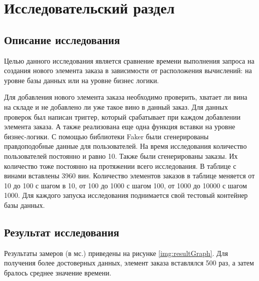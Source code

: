 \chapter{Исследовательский раздел}

\section{Описание исследования}

Целью данного исследования является сравнение времени выполнения запроса на создания нового элемента заказа в зависимости от расположения вычислений: на уровне базы данных или на уровне бизнес логики.

Для добавления нового элемента заказа необходимо проверить, хватает ли вина на складе и не добавлено ли уже такое вино в данный заказ. Для данных проверок был написан триггер, который срабатывает при каждом добавлении элемента заказа. А также реализована еще одна функция вставки на уровне бизнес-логики. С помощью библиотеки Faker\cite{faker} были сгенерированы правдоподобные данные для пользователей. На время исследования количество пользователей постоянно и равно 10. Также были сгенерированы заказы. Их количество тоже постоянно на протяжении всего исследования. В таблице с винами вставлены 3960 вин. Количество элементов заказов в таблице меняется от 10 до 100 с шагом в 10, от 100 до 1000 с шагом 100, от 1000 до 10000 с шагом 1000. Для каждого запуска исследования поднимается свой тестовый контейнер базы данных.

\section{Результат исследования}

Результаты замеров (в мс.) приведены на рисунке \ref{img:resultGraph}. Для получения более достоверных данных, элемент заказа вставлялся 500 раз, а затем бралось среднее значение времени. 


